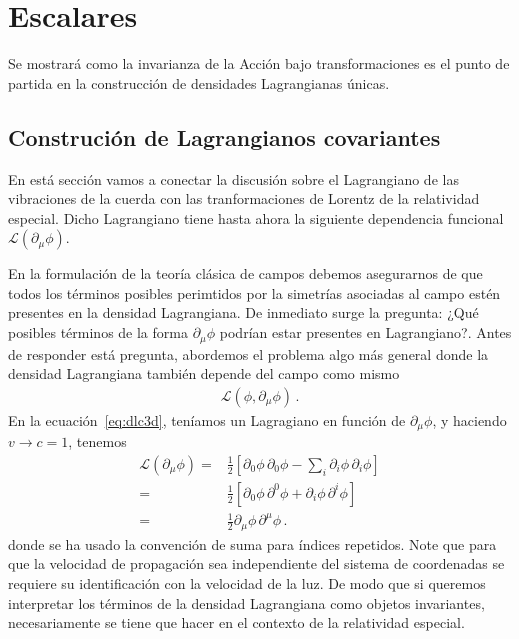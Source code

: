 \chapter{Escalares}
\label{cha:escalares}
Se mostrará como la invarianza de la Acción bajo transformaciones es el punto de partida en la construcción de densidades Lagrangianas únicas.




 

\section{Construción de Lagrangianos covariantes}
\begin{frame}
En está sección vamos a conectar la discusión sobre el Lagrangiano de las vibraciones de la cuerda con las tranformaciones de Lorentz de la relatividad especial. Dicho Lagrangiano tiene hasta ahora la siguiente dependencia funcional $\mathcal{L}(\partial_{\mu}\phi)$.

En la formulación de la teoría clásica de campos debemos asegurarnos de que todos los términos posibles perimtidos por la simetrías asociadas al campo estén presentes en la densidad Lagrangiana. De inmediato surge la pregunta: ¿Qué posibles términos de la forma $\partial_{\mu}\phi$ podrían estar presentes en Lagrangiano?. Antes de responder está pregunta, abordemos el problema algo más general donde la densidad Lagrangiana también depende del campo como mismo
\begin{align*}
  \mathcal{L}(\phi,\partial_\mu \phi)\,.
\end{align*}
En la ecuación~\eqref{eq:dlc3d}, teníamos un Lagragiano en función de $\partial_{\mu}\phi$, y haciendo $v\to c=1$, tenemos
\begin{align}
\label{eq:Lpr}
  \mathcal{L}(\partial_{\mu}\phi)
    =&\frac{1}{2}\left[
      {\partial_0\phi}\,{\partial_0\phi}-\sum_i{\partial_i\phi}\,{\partial_i\phi}
   \right]\nonumber\\
    =&\frac{1}{2}\left[
      {\partial_0\phi}\,{\partial^0\phi}+{\partial_i\phi}\,{\partial^i\phi}
   \right]\nonumber\\
   =&\frac{1}{2}{\partial_\mu\phi}\,{\partial^\mu\phi}\,.
\end{align}
donde se ha usado la convención de suma para índices repetidos. Note que para que la velocidad de propagación sea independiente del sistema de coordenadas se requiere su identificación con la velocidad de la luz. De modo que si queremos interpretar los términos de la densidad Lagrangiana como objetos invariantes, necesariamente se tiene que hacer en el contexto de la relatividad especial.
\end{frame}

